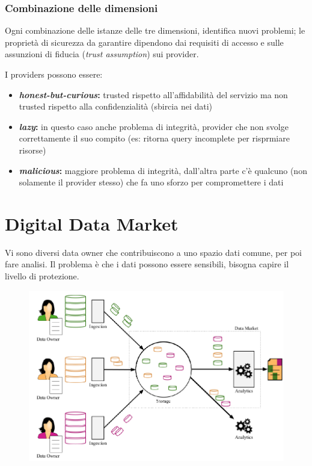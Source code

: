 \documentclass{report}
\begin{document}
\subsection{Combinazione delle dimensioni}
Ogni combinazione delle istanze delle tre dimensioni, identifica nuovi problemi; le proprietà di sicurezza da garantire
dipendono dai requisiti di accesso e sulle assunzioni di fiducia (\textit{trust assumption}) sui provider.

I providers possono essere:
\begin{itemize}
    \item \textbf{\textit{honest-but-curious}:} trusted rispetto all'affidabilità del servizio ma non trusted rispetto alla confidenzialità (sbircia nei dati)
    \item \textbf{\textit{lazy}:} in questo caso anche problema di integrità, provider che non svolge correttamente il suo compito (es: ritorna query incomplete per risprmiare risorse)
    \item \textbf{\textit{malicious}:} maggiore problema di integrità, dall'altra parte c'è qualcuno (non solamente il provider stesso) che fa uno sforzo per compromettere i dati
\end{itemize}

\chapter{Digital Data Market}
Vi sono diversi data owner che contribuiscono a uno spazio dati comune, per poi fare analisi.
Il problema è che i dati possono essere sensibili, bisogna capire il livello di protezione.
\begin{figure}[ht]
    \centering
    \includegraphics[width=1\linewidth]{images/digital data market.png}
\end{figure}
\end{document}
